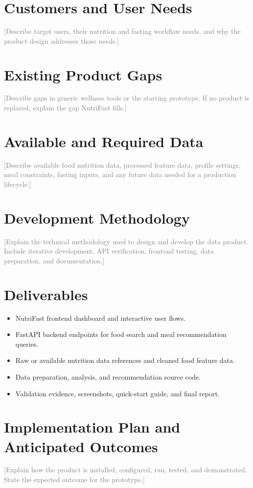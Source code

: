\documentclass[12pt]{report}
\newcommand{\placeholder}[1]{\textcolor{gray}{[#1]}}
\begin{document}
\section{Customers and User Needs}
\placeholder{Describe target users, their nutrition and fasting workflow needs, and why the product design addresses those needs.}

\section{Existing Product Gaps}
\placeholder{Describe gaps in generic wellness tools or the starting prototype. If no product is replaced, explain the gap NutriFast fills.}

\section{Available and Required Data}
\placeholder{Describe available food nutrition data, processed feature data, profile settings, meal constraints, fasting inputs, and any future data needed for a production lifecycle.}

\section{Development Methodology}
\placeholder{Explain the technical methodology used to design and develop the data product. Include iterative development, API verification, frontend testing, data preparation, and documentation.}

\section{Deliverables}
\begin{itemize}
    \item NutriFast frontend dashboard and interactive user flows.
    \item FastAPI backend endpoints for food search and meal recommendation queries.
    \item Raw or available nutrition data references and cleaned food feature data.
    \item Data preparation, analysis, and recommendation source code.
    \item Validation evidence, screenshots, quick-start guide, and final report.
\end{itemize}

\section{Implementation Plan and Anticipated Outcomes}
\placeholder{Explain how the product is installed, configured, run, tested, and demonstrated. State the expected outcome for the prototype.}
\end{document}
